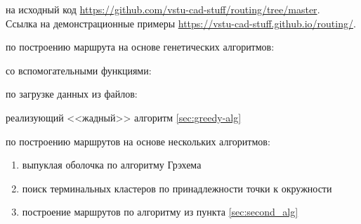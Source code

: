 \resumecontents
{}

 на исходный код \url{https://github.com/vstu-cad-stuff/routing/tree/master}.\\
Ссылка на демонстрационные примеры \url{https://vstu-cad-stuff.github.io/routing/}.

 по построению маршрута на основе генетических алгоритмов:


\pagebreak

 со вспомогательными функциями:


 по загрузке данных из файлов:


\pagebreak

 реализующий <<жадный>> алгоритм \ref{sec:greedy-alg}


\pagebreak

 по построению маршрутов на основе нескольких алгоритмов:
\begin{enumerate}
    \item выпуклая оболочка по алгоритму Грэхема
    \item поиск терминальных кластеров по принадлежности точки к окружности
    \item построение маршрутов по алгоритму из пункта \ref{sec:second_alg}
\end{enumerate}


